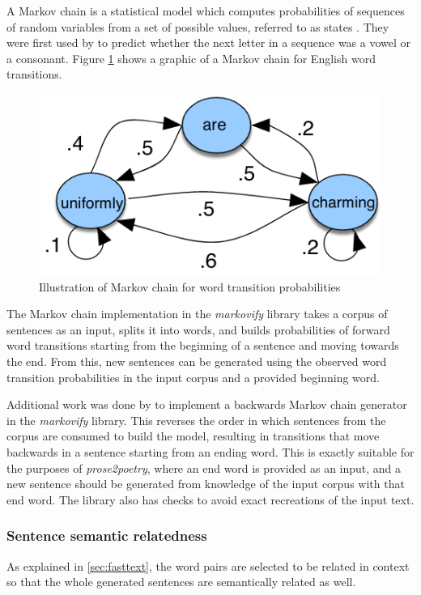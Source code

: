 \documentclass[11pt,a4paper]{article}
\begin{document}
A Markov chain is a statistical model which computes probabilities of sequences of random variables from a set of possible values, referred to as states \cite[Chapter~8]{jurafskymarkov}. They were first used by \citet{markov} to predict whether the next letter in a sequence was a vowel or a consonant. Figure \ref{fig:markov} shows a graphic of a Markov chain for English word transitions.

\begin{figure}
	\centering
	\includegraphics[scale=0.35]{./markov_chain.png}
	\caption{Illustration of Markov chain for word transition probabilities \cite{jurafskymarkov}}
\label{fig:markov}
\end{figure}

The Markov chain implementation in the \textit{markovify} library takes a corpus of sentences as an input, splits it into words, and builds probabilities of forward word transitions starting from the beginning of a sentence and moving towards the end. From this, new sentences can be generated using the observed word transition probabilities in the input corpus and a provided beginning word.

Additional work was done by \citet{markovifyfork} to implement a backwards Markov chain generator in the \textit{markovify} library. This reverses the order in which sentences from the corpus are consumed to build the model, resulting in transitions that move backwards in a sentence starting from an ending word. This is exactly suitable for the purposes of \textit{prose2poetry}, where an end word is provided as an input, and a new sentence should be generated from knowledge of the input corpus with that end word. The library also has checks to avoid exact recreations of the input text.

\subsubsection{Sentence semantic relatedness}
\label{sec:doc2vec}
As explained in \ref{sec:fasttext}, the word pairs are selected to be related in context so that the whole generated sentences are semantically related as well. 
\end{document}
